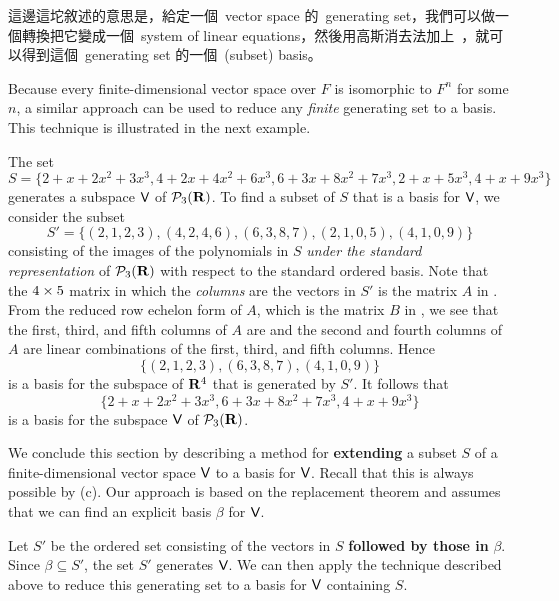 \begin{note}
這邊這坨敘述的意思是，給定一個\ vector space 的\ generating set，我們可以做一個轉換把它變成一個\ system of linear equations，然後用高斯消去法加上\ ，就可以得到這個\ generating set 的一個\ (subset) basis。
\end{note}

Because every finite-dimensional vector space over \(F\) is isomorphic to \(F^n\) for some \(n\), a similar approach can be used to reduce any \emph{finite} generating set to a basis.
This technique is illustrated in the next example.

\begin{example} \label{example 3.4.3}
The set
\[
    S = \{
        2 + x + 2x^2 + 3x^3,
        4 + 2x + 4x^2 + 6x^3,
        6 + 3x + 8x^2 + 7x^3,
        2 + x + 5x^3,
        4 + x + 9x^3
    \}
\]
generates a subspace \(\textsf{V}\) of \(\mathcal{P}_{3}(\mathbf{R})\).
To find a subset of \(S\) that is a basis for \(\textsf{V}\), we consider the subset
\[
    S' = \{(2,1,2,3),(4,2,4,6),(6,3,8,7),(2,1,0,5),(4,1,0,9)\}
\]
consisting of the images of the polynomials in \(S\) \emph{under the standard representation} of \(\mathcal{P}_{3}(\mathbf{R})\) with respect to the standard ordered basis.
Note that the \(4 \times 5\) matrix in which the \emph{columns} are the vectors in \(S'\) is the matrix \(A\) in .
From the reduced row echelon form of \(A\), which is the matrix \(B\) in ,
we see that the first, third, and fifth columns of \(A\) are \LID{} and the second and fourth columns of  \(A\) are linear combinations of the first, third, and fifth columns.
Hence
\[
    \{(2,1,2,3),(6,3,8,7),(4,1,0,9)\}
\]
is a basis for the subspace of \(\mathbf{R}^4\) that is generated by \(S'\).
It follows that
\[
    \{
        2 + x + 2 x^2 + 3x^3,
        6 + 3x + 8x^2 + 7x^3,
        4 + x + 9x^3
    \}
\]
is a basis for the subspace \(\textsf{V}\) of \(\mathcal{P}_{3}(\mathbf{R})\).
\end{example}

We conclude this section by describing a method for \textbf{extending} a \LID{} subset \(S\) of a finite-dimensional vector space \(\textsf{V}\) to a basis for \(\textsf{V}\).
Recall that this is always possible by (c).
Our approach is based on the replacement theorem and assumes that we can find an explicit basis \(\beta\) for \(\textsf{V}\).

Let \(S'\) be the ordered set consisting of the vectors in \(S\) \textbf{followed by those in} \(\beta\).
Since \(\beta \subseteq S'\), the set \(S'\) generates \(\textsf{V}\).
We can then apply the technique described above to reduce
this generating set to a basis for \(\textsf{V}\) containing \(S\).

